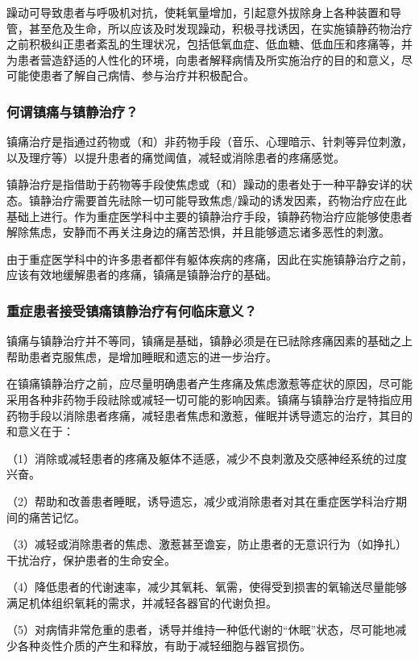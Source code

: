 躁动可导致患者与呼吸机对抗，使耗氧量增加，引起意外拔除身上各种装置和导管，甚至危及生命，所以应该及时发现躁动，积极寻找诱因，在实施镇静药物治疗之前积极纠正患者紊乱的生理状况，包括低氧血症、低血糖、低血压和疼痛等，并为患者营造舒适的人性化的环境，向患者解释病情及所实施治疗的目的和意义，尽可能使患者了解自己病情、参与治疗并积极配合。

\subsubsection{何谓镇痛与镇静治疗？}

镇痛治疗是指通过药物或（和）非药物手段（音乐、心理暗示、针刺等异位刺激，以及理疗等）以提升患者的痛觉阈值，减轻或消除患者的疼痛感觉。

镇静治疗是指借助于药物等手段使焦虑或（和）躁动的患者处于一种平静安详的状态。镇静治疗需要首先祛除一切可能导致焦虑/躁动的诱发因素，药物治疗应在此基础上进行。作为重症医学科中主要的镇静治疗手段，镇静药物治疗应能够使患者解除焦虑，安静而不再关注身边的痛苦恐惧，并且能够遗忘诸多恶性的刺激。

由于重症医学科中的许多患者都伴有躯体疾病的疼痛，因此在实施镇静治疗之前，应该有效地缓解患者的疼痛，镇痛是镇静治疗的基础。

\subsubsection{重症患者接受镇痛镇静治疗有何临床意义？}

镇痛与镇静治疗并不等同，镇痛是基础，镇静必须是在已祛除疼痛因素的基础之上帮助患者克服焦虑，是增加睡眠和遗忘的进一步治疗。

在镇痛镇静治疗之前，应尽量明确患者产生疼痛及焦虑激惹等症状的原因，尽可能采用各种非药物手段祛除或减轻一切可能的影响因素。镇痛与镇静治疗是特指应用药物手段以消除患者疼痛，减轻患者焦虑和激惹，催眠并诱导遗忘的治疗，其目的和意义在于：

（1）消除或减轻患者的疼痛及躯体不适感，减少不良刺激及交感神经系统的过度兴奋。

（2）帮助和改善患者睡眠，诱导遗忘，减少或消除患者对其在重症医学科治疗期间的痛苦记忆。

（3）减轻或消除患者的焦虑、激惹甚至谵妄，防止患者的无意识行为（如挣扎）干扰治疗，保护患者的生命安全。

（4）降低患者的代谢速率，减少其氧耗、氧需，使得受到损害的氧输送尽量能够满足机体组织氧耗的需求，并减轻各器官的代谢负担。

（5）对病情非常危重的患者，诱导并维持一种低代谢的“休眠”状态，尽可能地减少各种炎性介质的产生和释放，有助于减轻细胞与器官损伤。

